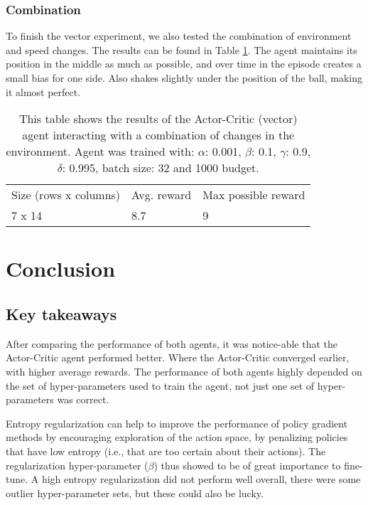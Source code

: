 \documentclass{article}
\begin{document}
    \subsubsection{Combination}
    To finish the vector experiment, we also tested the combination of environment and speed changes.
    The results can be found in Table \ref{tab:Vector-comb}. 
    The agent maintains its position in the middle as much as possible, and over time in the episode creates a small bias for one side. Also shakes slightly under the position of the ball, making it almost perfect. 
    
    \begin{table}[]
    \begin{tabular}{lll}
    Size (rows x columns) & Avg. reward & Max possible reward \\
    7 x 14                & 8.7         & 9                  
    \end{tabular}
    \caption{This table shows the results of the Actor-Critic (vector) agent interacting with a combination of changes in the environment. 
    Agent was trained with: $\alpha$: 0.001, $\beta$: 0.1, $\gamma$: 0.9, $\delta$: 0.995, batch size: 32 and 1000 budget. }
    \label{tab:Vector-comb}
    \end{table}
    
    \section{Conclusion}
    \label{Conclusion}
    
    
    
    \subsection{Key takeaways} %
    \label{C-Takeaways}
    After comparing the performance of both agents, it was notice-able that the Actor-Critic agent performed better. 
    Where the Actor-Critic converged earlier, with higher average rewards.
    The performance of both agents highly depended on the set of hyper-parameters used to train the agent, not just one set of hyper-parameters was correct. 
    
    Entropy regularization can help to improve the performance of policy gradient methods by encouraging exploration of the action space, by penalizing policies that have low entropy (i.e., that are too certain about their actions).
    The regularization hyper-parameter ($\beta$) thus showed to be of great importance to fine-tune. 
    A high entropy regularization did not perform well overall, there were some outlier hyper-parameter sets, but these could also be lucky. 
    
\end{document}
